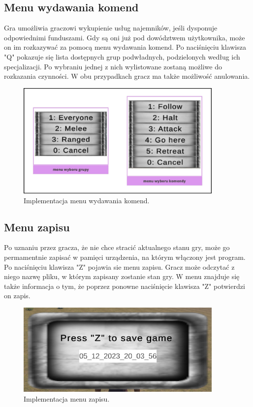 \subsection{Menu wydawania komend}
Gra umożliwia graczowi wykupienie usług najemników, jeśli dysponuje odpowiednimi funduszami. Gdy są oni już pod dowództwem użytkownika, może on im rozkazywać za pomocą 
menu wydawania komend. Po naciśnięciu klawisza "Q" pokazuje się lista dostępnych grup podwładnych, podzielonych według ich specjalizacji. Po wybraniu jednej z nich 
wylistowane zostaną możliwe do rozkazania czynności. W obu przypadkach gracz ma także możliwość anulowania. 
\begin{figure}[htbp]
    \centering
    \includegraphics[width=0.9\textwidth]{images/ui/opis_ekementow_mwnu_wyboru_komendy.png}
    \caption{Implementacja menu wydawania komend.}\label{fig:cmd_menu}
\end{figure}

\subsection{Menu zapisu}
Po uznaniu przez gracza, że nie chce stracić aktualnego stanu gry, może go permamentnie zapisać w pamięci urządzenia, na którym włączony jest program. Po naciśnięciu 
klawisza "Z" pojawia sie menu zapisu. Gracz może odczytać z niego nazwę pliku, w którym zapisany zostanie stan gry. W menu znajduje się także informacja o tym, że 
poprzez ponowne naciśnięcie klawisza "Z" potwierdzi on zapis. 
\begin{figure}[htbp]
    \centering
    \includegraphics[width=0.9\textwidth]{images/ui/menu_zapisu.png}
    \caption{Implementacja menu zapisu.}\label{fig:men_zap}
\end{figure}

